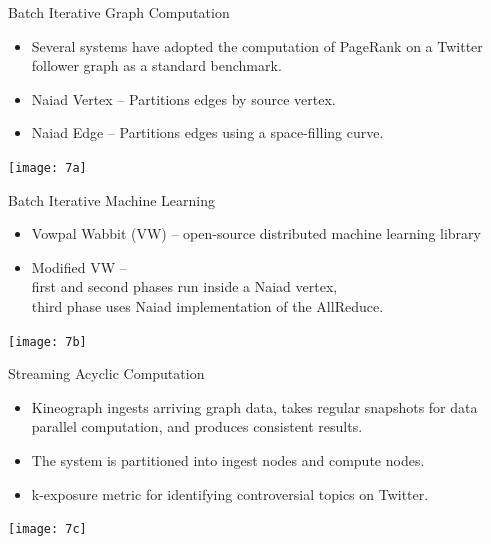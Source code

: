 \begin{frame}[t]{Batch Iterative Graph Computation}
  \vspace{0.15cm}

  \begin{itemize}
    \setlength\itemsep{0.15cm}
    \item Several systems have adopted the computation of PageRank on a Twitter follower graph as a standard benchmark.
    \item Naiad Vertex -- Partitions edges by source vertex.
    \item Naiad Edge -- Partitions edges using a space-filling curve. 
  \end{itemize}

  \vspace{0.15cm}
  \begin{center}
    \texttt{[image: 7a]}
  \end{center}
\end{frame}

\begin{frame}[t]{Batch Iterative Machine Learning}
  \vspace{0.15cm}

  \begin{itemize}
    \setlength\itemsep{0.15cm}
    \item Vowpal Wabbit (VW) -- open-source distributed machine learning library
    \item Modified VW -- \\first and second phases run inside a Naiad vertex, \\third phase uses Naiad implementation of the AllReduce.
  \end{itemize}

  \vspace{0.15cm}
  \begin{center}
    \texttt{[image: 7b]}
  \end{center}
\end{frame}

\begin{frame}[t]{Streaming Acyclic Computation}
  \vspace{0.15cm}

  \begin{itemize}
    \setlength\itemsep{0.15cm}
    \item Kineograph ingests arriving graph data, takes regular snapshots for data parallel computation, and produces consistent results.
    \item The system is partitioned into ingest nodes and compute nodes.
    \item k-exposure metric for identifying controversial topics on Twitter.
  \end{itemize}

  \begin{center}
    \texttt{[image: 7c]}
  \end{center}
\end{frame}

